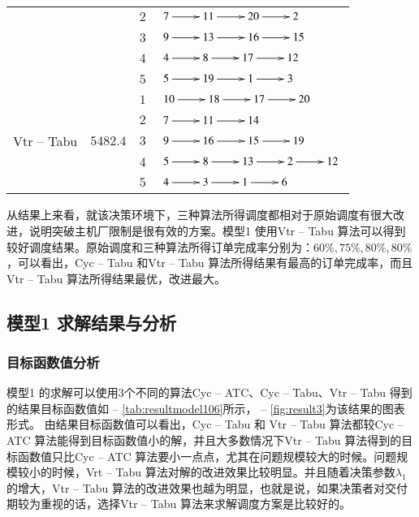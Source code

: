 \begin{table}[h!]
\begin{tabular}{cccl}
          &       & $2$     & $\xymatrix{7 \ar[r] & 11 \ar[r] & 20 \ar[r] & 2}$ \\
          &       & $3$     &  $\xymatrix{9 \ar[r] & 13 \ar[r] & 16 \ar[r] & 15}$\\
          &       & $4$     &  $\xymatrix{4 \ar[r] & 8 \ar[r] & 17 \ar[r] & 12}$\\
          &       & $5$     &  $\xymatrix{5 \ar[r] & 19 \ar[r] & 1 \ar[r] & 3}$\\
       \hline
    \multirow{5}[2]{*}{Vtr -- Tabu} & \multirow{5}[2]{*}{$5482.4$} & $1$     &  $\xymatrix{10 \ar[r] & 18 \ar[r] & 17 \ar[r] & 20}$\\
          &       & $2$     & $\xymatrix{7 \ar[r] & 11 \ar[r] & 14 }$ \\
          &       & $3$     &  $\xymatrix{9 \ar[r] & 16 \ar[r] & 15 \ar[r] & 19}$\\
          &       & $4$     &  $\xymatrix{5\ar[r] & 8 \ar[r] & 13 \ar[r] & 2\ar[r] & 12}$\\
          &       & $5$     &  $\xymatrix{4 \ar[r] & 3 \ar[r] & 1 \ar[r] & 6}$\\
    \bottomrule
    \end{tabular}
  \label{tab:resultexample20}
\end{table}

从结果上来看，就该决策环境下，三种算法所得调度都相对于原始调度有很大改进，说明突破主机厂限制是很有效的方案。模型1 使用Vtr -- Tabu 算法可以得到较好调度结果。原始调度和三种算法所得订单完成率分别为：$60\%, 75\%, 80\%, 80\%$，可以看出，Cyc -- Tabu 和Vtr -- Tabu 算法所得结果有最高的订单完成率，而且Vtr -- Tabu 算法所得结果最优，改进最大。
\subsection{模型1 求解结果与分析}
\subsubsection{目标函数值分析}
模型1 的求解可以使用3个不同的算法Cyc -- ATC、Cyc -- Tabu、Vtr -- Tabu 得到的结果目标函数值如 -- \ref{tab:resultmodel106}所示， -- \ref{fig:result3}为该结果的图表形式。
由结果目标函数值可以看出，Cyc -- Tabu 和 Vtr -- Tabu 算法都较Cyc -- ATC 算法能得到目标函数值小的解，并且大多数情况下Vtr -- Tabu 算法得到的目标函数值只比Cyc -- ATC 算法要小一点点，尤其在问题规模较大的时候。问题规模较小的时候，Vrt -- Tabu 算法对解的改进效果比较明显。并且随着决策参数$\lambda_1$的增大，Vtr -- Tabu 算法的改进效果也越为明显，也就是说，如果决策者对交付期较为重视的话，选择Vtr -- Tabu 算法来求解调度方案是比较好的。
